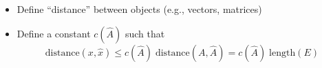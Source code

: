 \documentclass[11pt,twoside]{report}
\newcommand{\vecnot}[1]{#1}
\begin{document}
\begin{itemize}
\begin{itemize}
  \item Define ``distance''  between objects (e.g., vectors, matrices)
  \item Define a constant $c(\hat{A})$ such that
  \[ \text{distance}(\vecnot{x},\hat{\vecnot{x}}) \leq c(\hat{A}) \; \text{distance}(A,\hat{A}) = c(\hat{A}) \; \text{length}(E)  \]
\end{itemize}
\end{itemize}
\end{document}
